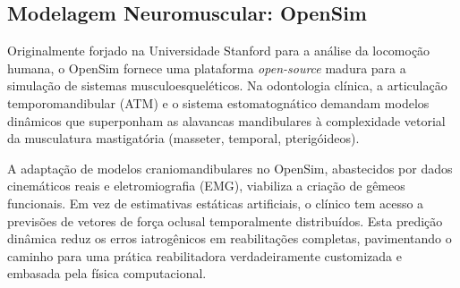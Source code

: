 \subsection{Modelagem Neuromuscular: OpenSim}

Originalmente forjado na Universidade Stanford para a análise da locomoção humana, o OpenSim fornece uma plataforma \textit{open-source} madura para a simulação de sistemas musculoesqueléticos. Na odontologia clínica, a articulação temporomandibular (ATM) e o sistema estomatognático demandam modelos dinâmicos que superponham as alavancas mandibulares à complexidade vetorial da musculatura mastigatória (masseter, temporal, pterigóideos).

A adaptação de modelos craniomandibulares no OpenSim, abastecidos por dados cinemáticos reais e eletromiografia (EMG), viabiliza a criação de gêmeos funcionais. Em vez de estimativas estáticas artificiais, o clínico tem acesso a previsões de vetores de força oclusal temporalmente distribuídos. Esta predição dinâmica reduz os erros iatrogênicos em reabilitações completas, pavimentando o caminho para uma prática reabilitadora verdadeiramente customizada e embasada pela física computacional.

